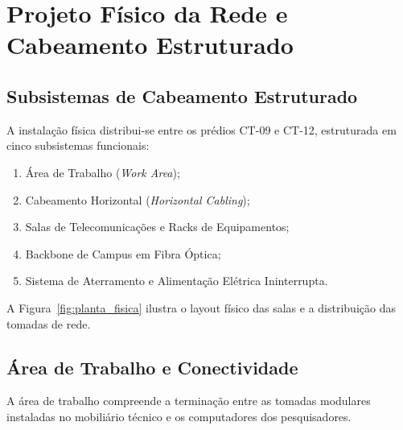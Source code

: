 
\chapter{Projeto Físico da Rede e Cabeamento Estruturado}
\label{cap:projeto_fisico}

\section{Subsistemas de Cabeamento Estruturado}

A instalação física distribui-se entre os prédios CT-09 e CT-12, estruturada em cinco subsistemas funcionais:
\begin{enumerate}
    \item Área de Trabalho (\textit{Work Area});
    \item Cabeamento Horizontal (\textit{Horizontal Cabling});
    \item Salas de Telecomunicações e Racks de Equipamentos;
    \item Backbone de Campus em Fibra Óptica;
    \item Sistema de Aterramento e Alimentação Elétrica Ininterrupta.
\end{enumerate}

A Figura~\ref{fig:planta_fisica} ilustra o layout físico das salas e a distribuição das tomadas de rede.


\section{Área de Trabalho e Conectividade}

A área de trabalho compreende a terminação entre as tomadas modulares instaladas no mobiliário técnico e os computadores dos pesquisadores.

